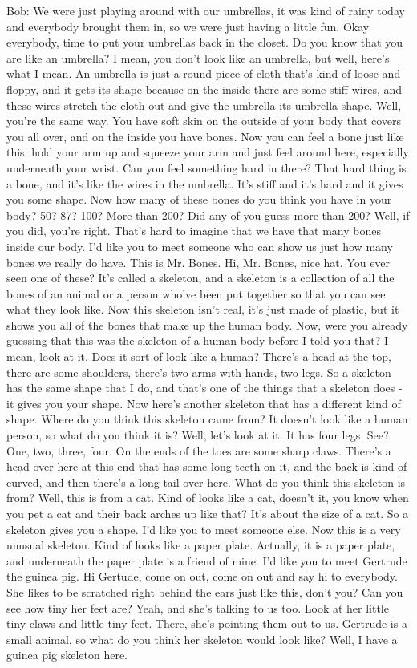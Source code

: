 Bob: We were just playing around with our umbrellas, it was kind of rainy today and everybody brought them in, so we were just having a little fun. Okay everybody, time to put your umbrellas back in the closet. Do you know that you are like an umbrella? I mean, you don't look like an umbrella, but well, here's what I mean. An umbrella is just a round piece of cloth that's kind of loose and floppy, and it gets its shape because on the inside there are some stiff wires, and these wires stretch the cloth out and give the umbrella its umbrella shape. Well, you're the same way. You have soft skin on the outside of your body that covers you all over, and on the inside you have bones. Now you can feel a bone just like this: hold your arm up and squeeze your arm and just feel around here, especially underneath your wrist. Can you feel something hard in there? That hard thing is a bone, and it's like the wires in the umbrella. It's stiff and it's hard and it gives you some shape. Now how many of these bones do you think you have in your body? 50? 87? 100? More than 200? Did any of you guess more than 200? Well, if you did, you're right. That's hard to imagine that we have that many bones inside our body. I'd like you to meet someone who can show us just how many bones we really do have. This is Mr. Bones. Hi, Mr. Bones, nice hat. You ever seen one of these? It's called a skeleton, and a skeleton is a collection of all the bones of an animal or a person who've been put together so that you can see what they look like. Now this skeleton isn't real, it's just made of plastic, but it shows you all of the bones that make up the human body. Now, were you already guessing that this was the skeleton of a human body before I told you that? I mean, look at it. Does it sort of look like a human? There's a head at the top, there are some shoulders, there's two arms with hands, two legs. So a skeleton has the same shape that I do, and that's one of the things that a skeleton does - it gives you your shape. Now here's another skeleton that has a different kind of shape. Where do you think this skeleton came from? It doesn't look like a human person, so what do you think it is? Well, let's look at it. It has four legs. See? One, two, three, four. On the ends of the toes are some sharp claws. There's a head over here at this end that has some long teeth on it, and the back is kind of curved, and then there's a long tail over here. What do you think this skeleton is from? Well, this is from a cat. Kind of looks like a cat, doesn't it, you know when you pet a cat and their back arches up like that? It's about the size of a cat. So a skeleton gives you a shape. I'd like you to meet someone else. Now this is a very unusual skeleton. Kind of looks like a paper plate. Actually, it is a paper plate, and underneath the paper plate is a friend of mine. I'd like you to meet Gertrude the guinea pig. Hi Gertude, come on out, come on out and say hi to everybody. She likes to be scratched right behind the ears just like this, don't you? Can you see how tiny her feet are? Yeah, and she's talking to us too. Look at her little tiny claws and little tiny feet. There, she's pointing them out to us. Gertrude is a small animal, so what do you think her skeleton would look like? Well, I have a guinea pig skeleton here. 